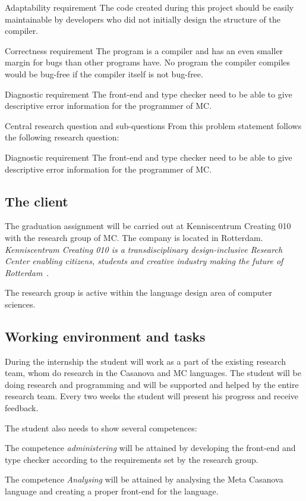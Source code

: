 Adaptability requirement
The code created during this project should be easily maintainable by developers who did not initially design the structure of the compiler.

Correctness requirement
The program is a compiler and has an even smaller margin for bugs than other programs have. 
No program the compiler compiles would be bug-free if the compiler itself is not bug-free.

Diagnostic requirement
The front-end and type checker need to be able to give descriptive error information for the programmer of MC.

Central research question and sub-questions
From this problem statement follows the following research question:

Diagnostic requirement
The front-end and type checker need to be able to give descriptive error information for the programmer of MC.

\subsection{The client}\label{sec:clientmandate}
The graduation assignment will be carried out at Kenniscentrum Creating 010 with the research group of MC.
The company is located in Rotterdam.
\textit{Kenniscentrum Creating 010 is a transdisciplinary design-inclusive Research Center enabling citizens, students and creative industry making the future of Rotterdam}~\cite{creating2016home}.

The research group is active within the language design area of computer sciences.


\subsection{Working environment and tasks}\label{sec:workenvmandate}
During the internship the student will work as a part of the existing research team, whom do research
in the Casanova and MC languages. The student will be doing research and programming
and will be supported and helped by the entire research team. Every two weeks the student will
present his progress and receive feedback.

The student also needs to show several competences:

The competence \emph{administering} will be attained by developing the front-end and type checker according to the requirements set by the research group.

The competence \emph{Analysing} will be attained by analysing the Meta Casanova language and creating a proper front-end for the language.

